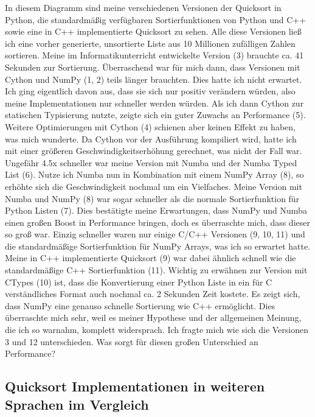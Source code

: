 \documentclass[11pt,a4paper]{article}
\begin{document}
In diesem Diagramm sind meine verschiedenen Versionen der Quicksort in Python,
die standardmäßig verfügbaren Sortierfunktionen von Python und C++
sowie eine in C++ implementierte Quicksort zu sehen.
Alle diese Versionen ließ ich eine vorher generierte, unsortierte Liste aus
10 Millionen zufälligen Zahlen sortieren.
Meine im Informatikunterricht entwickelte Version (3) brauchte ca. 41 Sekunden
zur Sortierung. Überraschend war für mich dann, dass Versionen mit Cython und NumPy
(1, 2) teils länger brauchten. Dies hatte ich nicht erwartet. Ich ging eigentlich davon aus,
dass sie sich nur positiv verändern würden, also meine Implementationen nur schneller werden
würden. Als ich dann Cython zur statischen Typisierung nutzte, zeigte sich ein
guter Zuwachs an Performance (5). Weitere Optimierungen mit Cython (4)
schienen aber keinen Effekt zu haben, was mich wunderte.
Da Cython vor der Ausführung kompiliert wird, hatte ich mit einer
größeren Geschwindigkeitserhöhung gerechnet, was nicht der Fall war.
Ungefähr 4.5x schneller war meine Version mit Numba und der Numba Typed List (6).
Nutze ich Numba nun in Kombination mit einem NumPy Array (8), so erhöhte sich
die Geschwindigkeit nochmal um ein Vielfaches.
Meine Version mit Numba und NumPy (8) war sogar schneller als die normale
Sortierfunktion für Python Listen (7). Dies bestätigte meine Erwartungen,
dass NumPy und Numba einen großen Boost in Performance bringen,
doch es überraschte mich, dass dieser so groß war.
Einzig schneller waren nur einige C/C++ Versionen (9, 10, 11) und die
standardmäßige Sortierfunktion für NumPy Arrays, was ich so erwartet hatte.
Meine in C++ implementierte Quicksort (9) war dabei ähnlich schnell
wie die standardmäßige C++ Sortierfunktion (11).
Wichtig zu erwähnen zur Version mit CTypes (10) ist, dass die Konvertierung
einer Python Liste in ein für C verständliches Format auch nochmal ca. 2 Sekunden
Zeit kostete.
Es zeigt sich, dass NumPy eine genauso schnelle Sortierung wie C++ ermöglicht.
Dies überraschte mich sehr, weil es meiner Hypothese und der allgemeinen Meinung,
die ich so warnahm, komplett widersprach.
Ich fragte mich wie sich die Versionen 3 und 12 unterschieden.
Was sorgt für diesen großen Unterschied an Performance?

\subsection{Quicksort Implementationen in weiteren Sprachen im Vergleich}
\end{document}
